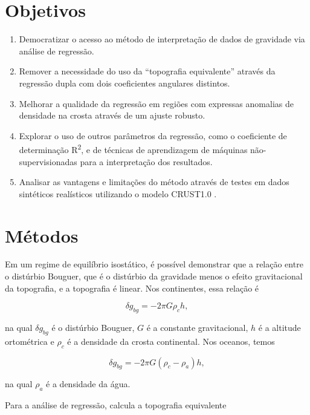 \documentclass[onecolumn,a4paper,11pt]{article}
\begin{document}
\section{Objetivos}

\begin{enumerate}
    \item Democratizar o acesso ao método de interpretação de dados de gravidade via análise de regressão.
    \item Remover a necessidade do uso da ``topografia equivalente'' através da regressão dupla com dois coeficientes angulares distintos.
    \item Melhorar a qualidade da regressão em regiões com expressas anomalias de densidade na crosta através de um ajuste robusto.
    \item Explorar o uso de outros parâmetros da regressão, como o coeficiente de determinação R\textsuperscript{2}, e de técnicas de aprendizagem de máquinas não-supervisionadas para a interpretação dos resultados.
    \item Analisar as vantagens e limitações do método através de testes em dados sintéticos realísticos utilizando o modelo CRUST1.0 \citep{Laske2013}.
\end{enumerate}

\section{Métodos}

Em um regime de equilíbrio isostático, é possível demonstrar que a relação entre o distúrbio Bouguer, que é o distúrbio da gravidade menos o efeito gravitacional da topografia, e a topografia é linear. Nos continentes, essa relação é

\begin{equation}
    \delta g_{bg} = -2 \pi G \rho_c h,
    \label{eq:bg-cont}
\end{equation}

\noindent
na qual $\delta g_{bg}$ é o distúrbio Bouguer, $G$ é a constante gravitacional, $h$
é a altitude ortométrica e $\rho_c$ é a densidade da crosta continental. Nos oceanos, temos

\begin{equation}
    \delta g_{bg} = -2 \pi G (\rho_{c} - \rho_a) h,
    \label{eq:bg-oce}
\end{equation}

\noindent
na qual $\rho_a$ é a densidade da água.

Para a análise de regressão, \citet{Braitenberg2015} calcula a topografia equivalente
\end{document}
